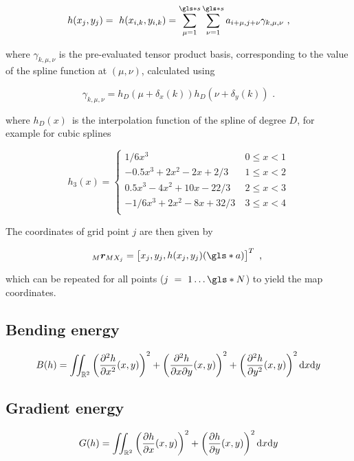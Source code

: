 \begin{equation}
  h(x_{j}, y_{j}) = h(x_{i, k}, y_{i, k}) = \summ{\mu}{s} \summ{\nu}{s} a_{i + \mu, j
  + \nu}\gamma_{k, \mu, \nu} \text{ ,}
\end{equation}

where $\gamma_{k, \mu, \nu}$ is the pre-evaluated tensor product basis,
corresponding to the value of the spline function at $(\mu,
\nu)$, calculated using 

\begin{equation}
  \gamma_{k, \mu, \nu} = h_D(\mu + \delta_x(k))h_D(\nu + \delta_y(k)) \text{ .}
\end{equation}

where $h_D(x)$ is the interpolation function of the spline of degree $D$, 
for example for cubic splines

\begin{equation}
  h_3(x) = 
  \begin{cases}
     1/6x^3 & \ 0 \leq x < 1 \\
     -0.5x^3 + 2x^2 - 2x + 2/3 & \ 1 \leq x < 2 \\
     0.5x^3 - 4x^2 + 10x - 22/3 & \ 2 \leq x < 3 \\
     -1/6x^3 + 2x^2 - 8x + 32/3 & \ 3 \leq x < 4 \\
  \end{cases}
  \label{eq:cubicspline}
\end{equation}

The coordinates of grid point $j$ are then given by

\begin{equation*}
  \mrmx = \begin{bmatrix} x_j, y_j, h(x_j,y_j)(\g{a})\end{bmatrix} ^T \text{ , }
\end{equation*}

which can be repeated for all points ($j = 1 \ldots \g{N}$) to yield the map
coordinates.  

\subsection{Bending energy}



\begin{equation}
  B(h) = \iint_{\mathbb{R}^2} 
  \left( \frac{\partial^2 h}{\partial x ^2}(x,y) \right)^2 + 
  \left( \frac{\partial^2 h}{\partial x \partial y}(x,y) \right)^2 + 
  \left( \frac{\partial^2 h}{\partial y ^2}(x,y) \right)^2
  \text{d}x\text{d}y
  \label{eq:basics:bending}
\end{equation}

\subsection{Gradient energy}

\begin{equation}
  G(h) = \iint_{\mathbb{R}^2} 
  \left( \frac{\partial h}{\partial x}(x,y) \right)^2 + 
  \left( \frac{\partial h}{\partial y}(x,y) \right)^2
  \text{d}x\text{d}y
  \label{eq:basics:gradient}
\end{equation}



